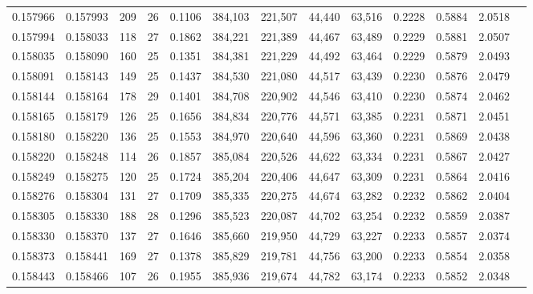 \begin{tabular}{rrrrrrrrrrrrr}
0.157966 & 0.157993 & 209 &  26 &                                     0.1106 & 384,103 & 221,507 &  44,440 &  63,516 & 0.2228 & 0.5884 & 2.0518 \\
0.157994 & 0.158033 & 118 &  27 &                                     0.1862 & 384,221 & 221,389 &  44,467 &  63,489 & 0.2229 & 0.5881 & 2.0507 \\
0.158035 & 0.158090 & 160 &  25 &                                     0.1351 & 384,381 & 221,229 &  44,492 &  63,464 & 0.2229 & 0.5879 & 2.0493 \\
0.158091 & 0.158143 & 149 &  25 &                                     0.1437 & 384,530 & 221,080 &  44,517 &  63,439 & 0.2230 & 0.5876 & 2.0479 \\
0.158144 & 0.158164 & 178 &  29 &                                     0.1401 & 384,708 & 220,902 &  44,546 &  63,410 & 0.2230 & 0.5874 & 2.0462 \\
0.158165 & 0.158179 & 126 &  25 &                                     0.1656 & 384,834 & 220,776 &  44,571 &  63,385 & 0.2231 & 0.5871 & 2.0451 \\
0.158180 & 0.158220 & 136 &  25 &                                     0.1553 & 384,970 & 220,640 &  44,596 &  63,360 & 0.2231 & 0.5869 & 2.0438 \\
0.158220 & 0.158248 & 114 &  26 &                                     0.1857 & 385,084 & 220,526 &  44,622 &  63,334 & 0.2231 & 0.5867 & 2.0427 \\
0.158249 & 0.158275 & 120 &  25 &                                     0.1724 & 385,204 & 220,406 &  44,647 &  63,309 & 0.2231 & 0.5864 & 2.0416 \\
0.158276 & 0.158304 & 131 &  27 &                                     0.1709 & 385,335 & 220,275 &  44,674 &  63,282 & 0.2232 & 0.5862 & 2.0404 \\
0.158305 & 0.158330 & 188 &  28 &                                     0.1296 & 385,523 & 220,087 &  44,702 &  63,254 & 0.2232 & 0.5859 & 2.0387 \\
0.158330 & 0.158370 & 137 &  27 &                                     0.1646 & 385,660 & 219,950 &  44,729 &  63,227 & 0.2233 & 0.5857 & 2.0374 \\
0.158373 & 0.158441 & 169 &  27 &                                     0.1378 & 385,829 & 219,781 &  44,756 &  63,200 & 0.2233 & 0.5854 & 2.0358 \\
0.158443 & 0.158466 & 107 &  26 &                                     0.1955 & 385,936 & 219,674 &  44,782 &  63,174 & 0.2233 & 0.5852 & 2.0348 \\

\end{tabular}
